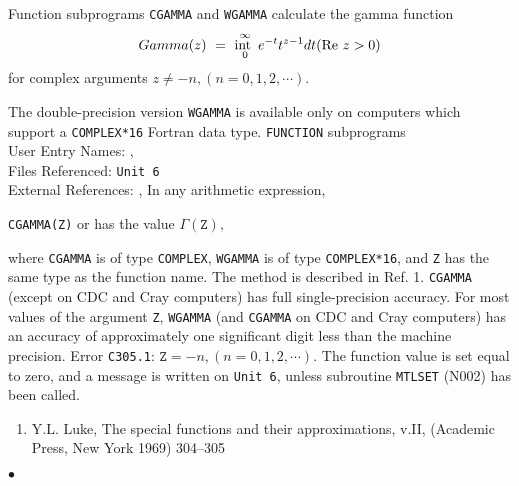                
           
\Submitter{}                    
            
Function subprograms {\tt CGAMMA} and {\tt WGAMMA} calculate
the gamma function
$$ \Gamma(z) \ = \ \displaystyle \int_0 ^{\infty} e^{-t} t^{z-1}dt \qquad
(\mbox{\rm Re } z>0) $$
for complex arguments $z \neq -n,(n = 0,1,2,\cdots)$.
\par
The double-precision version {\tt WGAMMA} is available only on computers
which support a {\tt COMPLEX*16} Fortran data type.
\Structure
{\tt FUNCTION} subprograms \\
User Entry Names: , \\
Files Referenced: {\tt Unit 6} \\
External References: , 
\Usage
In any arithmetic expression,
\begin{center}
{\tt CGAMMA(Z)} \quad or  \quad has the value \quad
$\Gamma(\mathtt{Z}),$
\end{center}
where {\tt CGAMMA} is of type {\tt COMPLEX}, {\tt WGAMMA} is of type
{\tt COMPLEX*16},
and {\tt Z} has the same type as the function name.
\Method
The method is described in Ref. 1.
\Accuracy
{\tt CGAMMA} (except on CDC and Cray computers)
has full single-precision accuracy.
For most values of the argument {\tt Z}, {\tt WGAMMA}
(and {\tt CGAMMA} on CDC and Cray computers) has an accuracy of
approximately one significant digit less than the machine precision.
\Errorh
Error {\tt C305.1}: $\mathtt{Z} = -n,(n = 0,1,2,\cdots).$
The function value is set equal to zero, and a message is written on
{\tt Unit 6}, unless subroutine {\tt MTLSET} (N002) has been called.
\Refer
\begin{enumerate}
\item Y.L. Luke, The special functions and their approximations,
v.II, (Academic Press, New York 1969) 304--305
\end{enumerate}
$\bullet$
